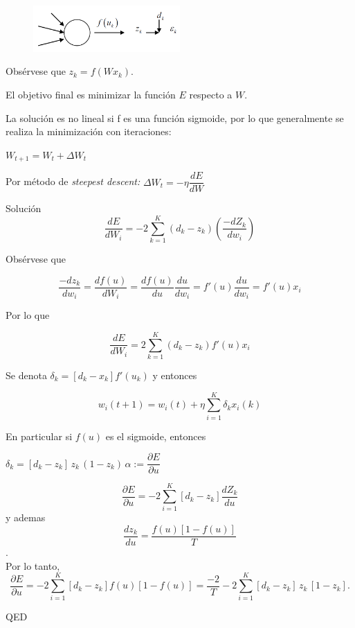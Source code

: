\begin{figure}[h!]
	\centering
	\includegraphics[width=0.5\textwidth]{images/img77.png}
	\label{figura77}
\end{figure}

Obsérvese que $z_k = f(Wx_k)$.

El objetivo final es minimizar la función $E$ respecto a $W$. 

La solución es no lineal si f es una función sigmoide, por lo que generalmente se realiza la minimización con
iteraciones:

$ W_{t+1} = W_t + \Delta W_t
$

Por método de \textit{steepest descent:}
$\Delta W_t= -\eta \dfrac{dE}{dW}
$

Solución
\\

$$
\dfrac{dE}{dW_i} = -2  \sum_{k=1}^{K}
(d_k - z_k) (\dfrac{-dZ_k}{dw_i})
$$

Obsérvese que

$$\dfrac{-dz_k}{dw_i} = \dfrac{df(u)}{dW_i} = \dfrac{df(u)}{du} \dfrac{du}{dw_i} = f'(u) \dfrac{du}{dw_i} = f'(u) x_i
$$

Por lo que

$$
\dfrac{dE}{dW_i} = 2 \sum_{k=1}^{K} (d_k - z_k) f'(u) x_i
$$

Se denota $\delta_k = [d_k - x_k] f'(u_k)$ y entonces

\begin{scaja}
	$$ w_i(t + 1) = w_i(t) + \eta \sum_{i=1}^{K} \delta_k x_i (k) $$
\end{scaja}

En particular si $f(u)$ es el sigmoide, entonces

$\delta_k=[d_k - z_k] \, z_k \,  (1-z_k)\, \alpha := \dfrac{\partial E}{\partial u}
$

\begin{scaja}
	$$ \dfrac{\partial E}{\partial u} = -2 \sum_{i=1}^{K} [d_k - z_k] \dfrac{dZ_k}{du} $$ y ademas $$\dfrac{dz_k}{du}= \dfrac{f(u)[1 - f(u)]}{T}
	$$.   \\  Por lo tanto, 
	$$
	\dfrac{\partial E}{\partial u} = -2 \sum_{i=1}^{K} [d_k - z_k] f(u) [1 - f(u)] = \dfrac{-2}{T} -2 \sum_{i=1}^{K} [d_k - z_k] \, z_k \, [1-z_k]. 
	$$
\begin{center}
	QED
\end{center}	
\end{scaja}

